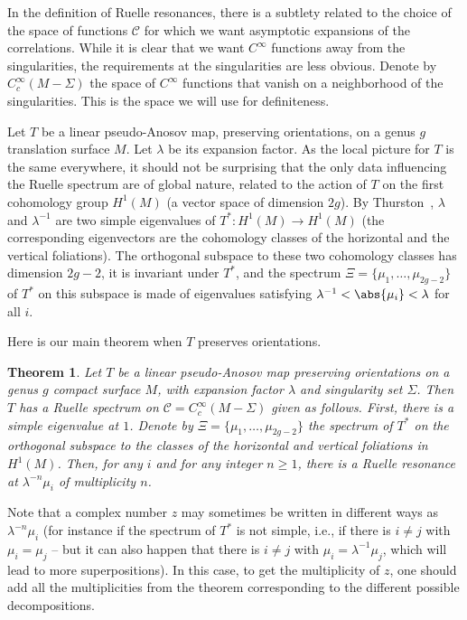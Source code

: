 \documentclass[11pt, a4paper, oneside, final, pagebackref]{amsart}
\newcommand{\boC}{\mathcal{C}}
\renewcommand{\geq}{\geqslant}
\newtheorem{thm}{Theorem}[section]
\theoremstyle{definition}
\numberwithin{equation}{section}
\begin{document}
In the definition of Ruelle resonances, there is a subtlety related to the
choice of the space of functions $\boC$ for which we want asymptotic
expansions of the correlations. While it is clear that we want $C^\infty$
functions away from the singularities, the requirements at the singularities
are less obvious. Denote by $C^\infty_c(M-\Sigma)$ the space of $C^\infty$
functions that vanish on a neighborhood of the singularities. This is the
space we will use for definiteness.

Let $T$ be a linear pseudo-Anosov map, preserving orientations, on a genus
$g$ translation surface $M$. Let $\lambda$ be its expansion factor. As the
local picture for $T$ is the same everywhere, it should not be surprising
that the only data influencing the Ruelle spectrum are of global nature,
related to the action of $T$ on the first cohomology group $H^1(M)$ (a vector
space of dimension $2g$). By Thurston~\cite{thurston_pseudo_anosov},
$\lambda$ and $\lambda^{-1}$ are two simple eigenvalues of $T^* : H^1(M)\to
H^1(M)$ (the corresponding eigenvectors are the cohomology classes of the
horizontal and the vertical foliations). The orthogonal subspace to these two
cohomology classes has dimension $2g-2$, it is invariant under $T^*$, and the
spectrum $\Xi = \{\mu_1,\dotsc,\mu_{2g-2}\}$ of $T^*$ on this subspace is
made of eigenvalues satisfying $\lambda^{-1} < \abs{\mu_i} < \lambda$ for all
$i$.

\medskip

Here is our main theorem when $T$ preserves orientations.

\begin{thm}
\label{thm:main_preserves_orientations} Let $T$ be a linear pseudo-Anosov map
preserving orientations on a genus $g$ compact surface $M$, with expansion
factor $\lambda$ and singularity set $\Sigma$. Then $T$ has a Ruelle spectrum
on $\boC = C^\infty_c(M-\Sigma)$ given as follows. First, there is a simple
eigenvalue at $1$. Denote by $\Xi = \{\mu_1,\dotsc, \mu_{2g-2}\}$ the
spectrum of $T^*$ on the orthogonal subspace to the classes of the horizontal
and vertical foliations in $H^1(M)$. Then, for any $i$ and for any integer
$n\geq 1$, there is a Ruelle resonance at $\lambda^{-n} \mu_i$ of
multiplicity $n$.
\end{thm}
Note that a complex number $z$ may sometimes be written in different ways as
$\lambda^{-n}\mu_i$ (for instance if the spectrum of $T^*$ is not simple,
i.e., if there is $i\neq j$ with $\mu_i = \mu_j$ -- but it can also happen
that there is $i\neq j$ with $\mu_i = \lambda^{-1}\mu_j$, which will lead to
more superpositions). In this case, to get the multiplicity of $z$, one
should add all the multiplicities from the theorem corresponding to the
different possible decompositions.
\end{document}
